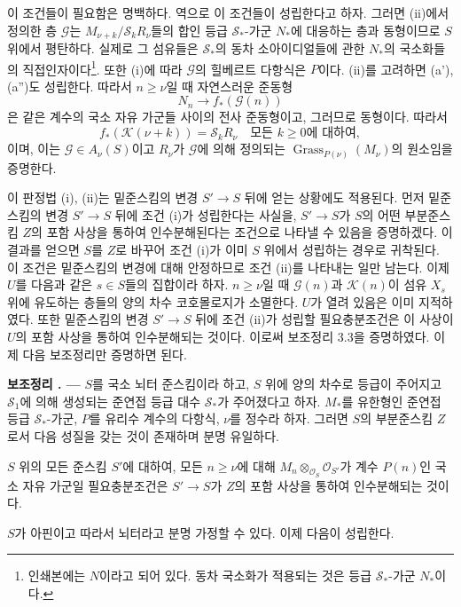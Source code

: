 \documentclass[11pt,twoside,openany]{book}
\numberwithin{equation}{section}
\newcommand{\sourceunit}{front}
\newcommand{\src}[1]{%
  \phantomsection\hypertarget{src:\sourceunit:#1}{}%
  \marginpar{\raggedleft\footnotesize\sffamily #1}%
}
\theoremstyle{plain}
\theoremstyle{definition}
\theoremstyle{remark}
\newcommand{\result}[2]{%
  \par\medskip\noindent\textbf{#1%
  \if\relax\detokenize{#2}\relax\else\space#2\fi. ---}\enspace
}
\begin{document}
이 조건들이 필요함은 명백하다. 역으로 이 조건들이 성립한다고 하자.
그러면 (ii)에서 정의한 층 $\mathcal G$는
$M_{\nu+k}/\mathcal S_kR_\nu$들의 합인 등급 $\mathcal S_*$-가군
$N_*$에 대응하는 층과 동형이므로 $S$ 위에서 평탄하다. 실제로 그
섬유들은 $\mathcal S_*$의 동차 소아이디얼들에 관한 $N_*$의 국소화들의
직접인자이다\footnote{인쇄본에는 $N$이라고 되어
있다. 동차 국소화가 적용되는 것은 등급 $\mathcal S_*$-가군 $N_*$이다.}.
또한 (i)에 따라 $\mathcal G$의 힐베르트 다항식은 $P$이다. (ii)를
고려하면 (a'), (a'')도 성립한다. 따라서 $n\geq\nu$일 때 자연스러운
준동형
\[
N_n\longrightarrow f_*(\mathcal G(n))
\]
은 같은 계수의 국소 자유 가군들 사이의 전사 준동형이고, 그러므로
동형이다. 따라서
\[
f_*(\mathcal K(\nu+k))=\mathcal S_kR_\nu
\quad\text{모든 $k\geq0$에 대하여},
\]
이며, 이는 $\mathcal G\in A_\nu(S)$이고 $R_\nu$가 $\mathcal G$에 의해
정의되는 $\operatorname{Grass}_{P(\nu)}(M_\nu)$의 원소임을 증명한다.

이 판정법 (i), (ii)는 밑준스킴의 변경 $S'\longrightarrow S$ 뒤에 얻는
상황에도 적용된다. 먼저 밑준스킴의 변경 $S'\longrightarrow S$ 뒤에
조건 (i)가 성립한다는 사실을, $S'\longrightarrow S$가 $S$의 어떤
부분준스킴 $Z$의 포함 사상을 통하여 인수분해된다는 조건으로 나타낼 수
있음을 증명하겠다. 이 결과를 얻으면 $S$를 $Z$로 바꾸어 조건 (i)가 이미
$S$ 위에서 성립하는 경우로 귀착된다. 이 조건은 밑준스킴의 변경에 대해
안정하므로 조건 (ii)를 나타내는 일만 남는다. 이제 $U$를 다음과 같은
$s\in S$들의 집합이라 하자. $n\geq\nu$일 때 $\mathcal G(n)$과
$\mathcal K(n)$이 섬유 $X_s$ 위에 유도하는 층들의 양의 차수 코호몰로지가
소멸한다. $U$가 열려 있음은 이미 지적하였다. 또한 밑준스킴의 변경
$S'\longrightarrow S$ 뒤에 조건 (ii)가 성립할 필요충분조건은 이 사상이
$U$의 포함 사상을 통하여 인수분해되는 것이다. 이로써 보조정리 3.3을
증명하였다. 이제 다음 보조정리만 증명하면 된다.

\result{보조정리}{3.4} $S$를 국소 뇌터 준스킴이라 하고, $S$ 위에 양의
차수로 등급이 주어지고 $\mathcal S_1$에 의해 생성되는 준연접 등급 대수
$\mathcal S_*$가 주어졌다고 하자. $M_*$를 유한형인 준연접 등급
$\mathcal S_*$-가군, $P$를 유리수 계수의 다항식, $\nu$를 정수라 하자.
그러면 $S$의 부분준스킴 $Z$로서 다음 성질을 갖는 것이 존재하며 분명
유일하다.
\src{263}
$S$ 위의 모든 준스킴 $S'$에 대하여, 모든 $n\geq\nu$에 대해
$M_n\otimes_{\mathcal O_S}\mathcal O_{S'}$가 계수 $P(n)$인 국소 자유
가군일 필요충분조건은 $S'\longrightarrow S$가 $Z$의 포함 사상을 통하여
인수분해되는 것이다.

$S$가 아핀이고 따라서 뇌터라고 분명 가정할 수 있다. 이제 다음이
성립한다.
\end{document}
